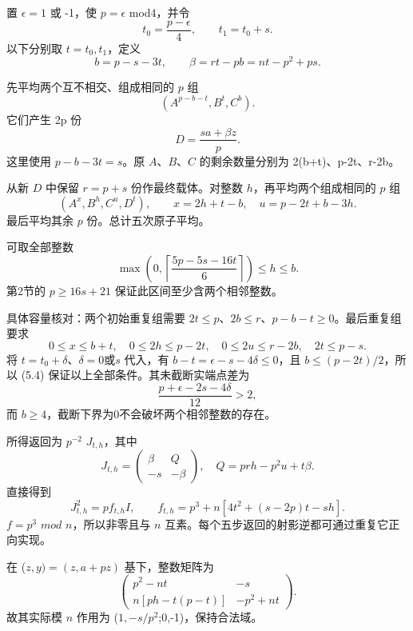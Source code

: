 \documentclass[11pt,a4paper]{article}
\theoremstyle{definition}
\numberwithin{equation}{section}
\begin{document}
{置} {\ensuremath{\epsilon =1}} {或} {-1，使} {\ensuremath{p=\epsilon }} {mod4，并令} \[
t_0=\frac{p-\epsilon}{4},\qquad
t_1=t_0+s.
\] {以下分别取} {\ensuremath{t=t_{0},t_{1}}，定义} \[
b=p-s-3t,\qquad
\beta=rt-pb=nt-p^2+ps.
\tag{C29.5.1}
\]

{先平均两个互不相交、组成相同的} {\ensuremath{p}} {组} \[
(A^{p-b-t},B^t,C^b).
\] {它们产生} {2p} {份} \[
D=\frac{s a+\beta z}{p}.
\tag{C29.5.2}
\] {这里使用} {\ensuremath{p-b-3t=s}。原} {\ensuremath{A}、\ensuremath{B}、\ensuremath{C}} {的剩余数量分别为} {2(b+t)、p-2t、r-2b。}

{从新} {\ensuremath{D}} {中保留} {\ensuremath{r=p+s}} {份作最终载体。对整数} {\ensuremath{h}，再平均两个组成相同的} {\ensuremath{p}} {组} \[
(A^x,B^h,C^u,D^t),\qquad
x=2h+t-b,\quad u=p-2t+b-3h.
\tag{C29.5.3}
\] {最后平均其余} {\ensuremath{p}} {份。总计五次原子平均。}

{可取全部整数} \[
\boxed{
\max\left(0,\left\lceil\frac{5p-5s-16t}{6}\right\rceil\right)
\le h\le b.}
\tag{C29.5.4}
\] {第2节的} {\ensuremath{p\ge 16s+21}} {保证此区间至少含两个相邻整数。}

{具体容量核对：两个初始重复组需要} {\ensuremath{2t\le p}、\ensuremath{2b\le r}、\ensuremath{p-b-t\ge 0}。最后重复组要求} \[
0\le x\le b+t,\quad
0\le2h\le p-2t,\quad
0\le2u\le r-2b,\quad
2t\le p-s.
\] {将} {\ensuremath{t=t_{0}+\delta }、\ensuremath{\delta =0}或\ensuremath{s}} {代入，有} {\ensuremath{b-t=\epsilon -s-4\delta \le 0}，且} {\ensuremath{b\le (p-2t)/2}，所以} {(5.4)} {保证以上全部条件。其未截断实端点差为} \[
\frac{p+\epsilon-2s-4\delta}{12}>2,
\] {而} {\ensuremath{b\ge 4}，截断下界为0不会破坏两个相邻整数的存在。}

{所得返回为} {\ensuremath{p^{-2}}} {\ensuremath{J_{t,h}}，其中} \[
J_{t,h}=
\begin{pmatrix}\beta&Q\\-s&-\beta\end{pmatrix},
\quad
Q=prh-p^2u+t\beta.
\] {直接得到} \[
\boxed{
J_{t,h}^2=p f_{t,h}I,\qquad
f_{t,h}=p^3+n[4t^2+(s-2p)t-sh].}
\tag{C29.5.5}
\] {\ensuremath{f=p^{3}}} {\ensuremath{mod}} {\ensuremath{n}，所以非零且与} {\ensuremath{n}} {互素。每个五步返回的射影逆都可通过重复它正向实现。}

{在} {(\ensuremath{z,y)=(z,a+pz)}} {基下，整数矩阵为} \[
\begin{pmatrix}
p^2-nt&-s\\
n[ph-t(p-t)]&-p^2+nt
\end{pmatrix}.
\tag{C29.5.6}
\] {故其实际模} {\ensuremath{n}} {作用为} {(\ensuremath{1,-s/p^{2}};0,-1)，保持合法域。}
\end{document}
